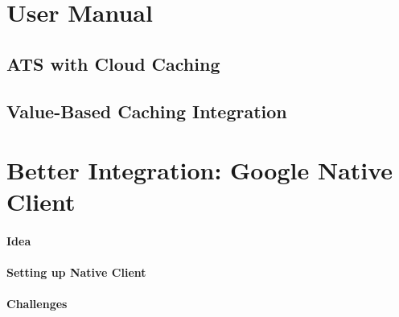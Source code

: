 \begin{appendices}

\section{User Manual}

\subsection{ATS with Cloud Caching}

\subsection{Value-Based Caching Integration}

\section{Better Integration: Google Native Client}

\paragraph{Idea}

\paragraph{Setting up Native Client}

\paragraph{Challenges}

\end{appendices}
